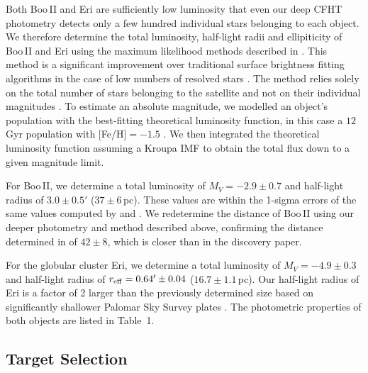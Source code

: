 \documentclass{../tex_files/emulateapj}
\begin{document}
Both Boo\,II and Eri are sufficiently low luminosity that even our
deep CFHT photometry detects only a few hundred individual stars
belonging to each object.  We therefore determine the total
luminosity, half-light radii and ellipiticity of Boo\,II and Eri using
the maximum likelihood methods described in \citet{munoz10a}.  This
method is a significant improvement over traditional surface
brightness fitting algorithms in the case of low numbers of resolved
stars \citep{martin08a, munoz10b}.  The method relies solely on the
total number of stars belonging to the satellite and not on their
individual magnitudes \citep{munoz10a}.  To estimate an absolute
magnitude, we modelled an object's population with the best-fitting
theoretical luminosity function, in this case a $12$\,Gyr population
with [Fe/H]$=-1.5$ \citep{girardi02a}. We then integrated the
theoretical luminosity function assuming a Kroupa IMF to obtain the
total flux down to a given magnitude limit.


For Boo\,II, we determine a total luminosity of $M_V = -2.9\pm 0.7$
and half-light radius of $3.0 \pm 0.5'$ ($37 \pm 6$\,pc).  These
values are within the 1-sigma errors of the same values computed by
\citet{2008ApJ...688..245W} and \citet{2008ApJ...684.1075M}.  We
redetermine the distance of Boo\,II using our deeper photometry and
method described above, confirming the distance determined in
\citet{2008ApJ...688..245W} of $42\pm8$, which is closer than in the
\citet{2007ApJ...662L..83W} discovery paper.


For the globular cluster Eri, we determine a total luminosity of $M_V
= -4.9\pm 0.3$ and half-light radius of $r_{\rm eff} = 0.64'\pm0.04$
($16.7 \pm 1.1$\,pc).  Our half-light radius of Eri is a factor of 2
larger than the previously determined size based on significantly
shallower Palomar Sky Survey plates \citep{ortolani86a, harris96a}.
The photometric properties of both objects are listed in Table~1.


\subsection{Target Selection}\label{subsec_targets}
\end{document}
